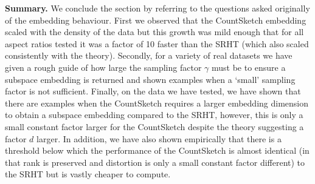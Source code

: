 \medskip
\textbf{Summary.}
 We conclude the section by referring to the questions asked originally of the
 embedding behaviour.
 First we observed that the CountSketch embedding scaled with the density of the
 data but this growth was mild enough that for all aspect ratios tested it was
 a factor of 10 faster than the SRHT (which also scaled consistently with the
 theory).
 Secondly, for a variety of real datasets we have given a rough guide of how
 large the sampling factor $\gamma$ must be to ensure a subspace embedding is
 returned and shown examples when a `small' sampling factor is not sufficient.
 Finally, on the data we have tested, we have shown that there are examples
 when the CountSketch requires a larger embedding dimension to obtain a subspace
 embedding compared to the SRHT, however, this is only a small constant factor
 larger for the CountSketch despite the theory suggesting a factor $d$ larger.
 In addition, we have also shown empirically that there is a threshold below
 which the performance of the CountSketch is almost identical (in that rank is
 preserved and distortion is only a small constant factor different) to the SRHT
 but is vastly cheaper to compute.



